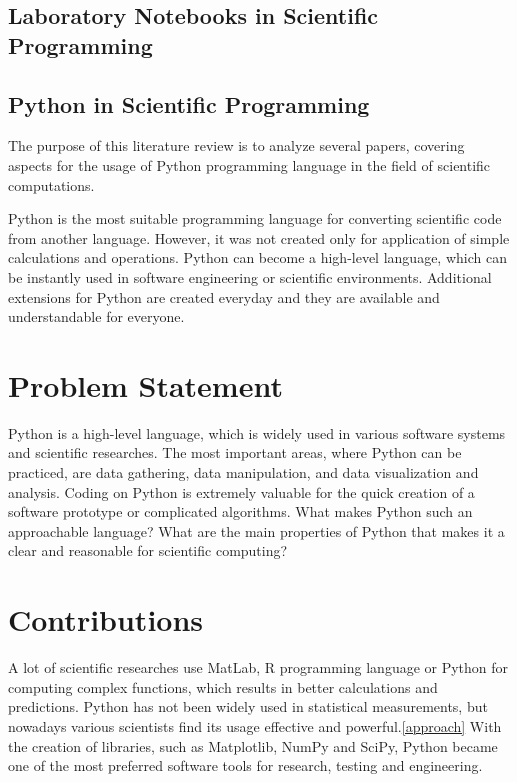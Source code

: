\subsection{Laboratory Notebooks in Scientific Programming}
\subsection{Python in Scientific Programming}


%
%
\abstract{}
The purpose of this literature review is to analyze several papers, covering aspects for the usage of Python programming language in the field of scientific computations. 

Python is the most suitable programming language for converting scientific code from another language. However, it was not created only for application of simple calculations and operations. Python can become a high-level language, which can be instantly used in software engineering or scientific environments. Additional extensions for Python are created everyday and they are available and understandable for everyone.

\section{Problem Statement}

Python is a high-level language, which is widely used in various software systems and scientific researches. The most important areas, where Python can be practiced, are data gathering, data manipulation, and data visualization and analysis. Coding on Python is extremely valuable for the quick creation of a software prototype or complicated algorithms. What makes Python such an approachable language? What are the main properties of Python that makes it a clear and reasonable for scientific computing? 


\section{Contributions}
A lot of scientific researches use MatLab, R programming language or Python for computing complex functions, which results in better calculations and predictions. Python has not been widely used in statistical measurements, but nowadays various scientists find its usage effective and powerful.\ref{approach} With the creation of libraries, such as Matplotlib, NumPy and SciPy, Python became one of the most preferred software tools for research, testing and engineering. 

